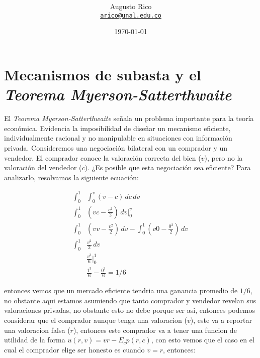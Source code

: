 \documentclass[11pt]{article}
\title{\text{Microeconomia III - $5^a$ Monitoria}
}
\author{Augusto Rico\\%
    \href{mailto:arico@unal.edu.co}{\texttt{arico@unal.edu.co}}
    }
\date{\today}
\begin{document}
\maketitle


\section{Mecanismos de subasta y el \textit{Teorema Myerson-Satterthwaite}}

\begin{flushleft}

    El \textit{Teorema Myerson-Satterthwaite} señala un problema importante para la teoría económica. Evidencia la imposibilidad de diseñar un mecanismo eficiente, individualmente racional y no manipulable en situaciones con información privada. Consideremos una negociación bilateral con un comprador y un vendedor. El comprador conoce la valoración correcta del bien ($v$), pero no la valoración del vendedor ($c$). ¿Es posible que esta negociación sea eficiente? Para analizarlo, resolvamos la siguiente ecuación:

    \begin{align*}
        \int_{0}^{1}&\int_{0}^{v} (v-c) \,dc\,dv\\
        \int_{0}^{1}&\left(vc-\frac{c^2}{2}\right)\,dv\Big|_0^v\\
        \int_{0}^{1}&\left(vv-\frac{v^2}{2}\right)\,dv-\int_{0}^{1}\left(v0-\frac{0^2}{2}\right)\,dv\\
        \int_{0}^{1}&\frac{v^2}{2}\,dv\\
        &\frac{v^3}{6}\Big|_0^1\\
        &\frac{1^3}{6}-\frac{0^3}{6}=1/6
    \end{align*}

    entonces vemos que un mercado eficiente tendria una ganancia promedio de $1/6$, no obstante aqui estamos asumiendo que tanto comprador y vendedor revelan sus valoraciones privadas, no obstante esto no debe porque ser asi, entonces podemos considerar que el comprador aunque tenga una valoracion ($v$), este va a reportar una valoracion falsa ($r$), entonces este comprador va a tener una funcion de utilidad de la forma $u(r,v)=vr-E_cp(r,c)$, con esto vemos que el caso en el cual el comprador elige ser honesto es cuando $v=r$, entonces:


\end{flushleft}
\end{document}
